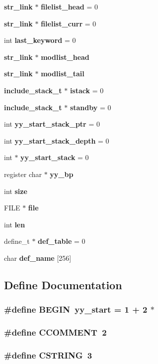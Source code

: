 \begin{CompactItemize}
\item 
{\bf str\_\-link} $\ast$ {\bf filelist\_\-head} = 0
\item 
{\bf str\_\-link} $\ast$ {\bf filelist\_\-curr} = 0
\item 
int {\bf last\_\-keyword} = 0
\item 
{\bf str\_\-link} $\ast$ {\bf modlist\_\-head}
\item 
{\bf str\_\-link} $\ast$ {\bf modlist\_\-tail}
\item 
{\bf include\_\-stack\_\-t} $\ast$ {\bf istack} = 0
\item 
{\bf include\_\-stack\_\-t} $\ast$ {\bf standby} = 0
\item 
int {\bf yy\_\-start\_\-stack\_\-ptr} = 0
\item 
int {\bf yy\_\-start\_\-stack\_\-depth} = 0
\item 
int $\ast$ {\bf yy\_\-start\_\-stack} = 0
\item 
register char $\ast$ {\bf yy\_\-bp}
\item 
int {\bf size}
\item 
FILE $\ast$ {\bf file}
\item 
int {\bf len}
\item 
define\_\-t $\ast$ {\bf def\_\-table} = 0
\item 
char {\bf def\_\-name} [256]
\end{CompactItemize}


\subsection{Define Documentation}
\subsubsection{\setlength{\rightskip}{0pt plus 5cm}\#define BEGIN\ {\bf yy\_\-start} = 1 + 2 $\ast$}\label{lexer_8c_a24}


\subsubsection{\setlength{\rightskip}{0pt plus 5cm}\#define CCOMMENT\ 2}\label{lexer_8c_a58}


\subsubsection{\setlength{\rightskip}{0pt plus 5cm}\#define CSTRING\ 3}\label{lexer_8c_a59}



